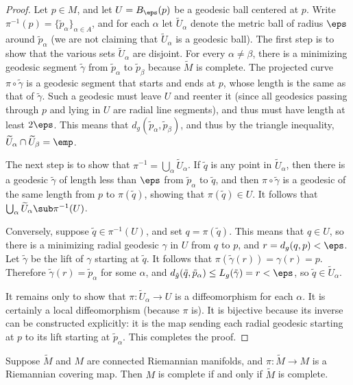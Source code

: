 \begin{proof}
Let $p\in M$, and let $U=B_{\eps}(p)$ be a geodesic ball centered at $p$. Write $\pi^{-1}(p)=\{\tilde{p}_\alpha\}_{\alpha\in A}$, and for each $\alpha$ let $\widetilde{U}_\alpha$ 
denote the metric ball of radius $\eps$ around $\tilde{p}_\alpha$ (we are not claiming that $\widetilde{U}_\alpha$ is a geodesic ball). The first step is to show that the various sets $\widetilde{U}_\alpha$ are disjoint. For every $\alpha\neq\beta$, there is a minimizing geodesic segment $\tilde{\gamma}$ from $\tilde{p}_\alpha$ to $\tilde{p}_\beta$ because $\widetilde{M}$ is complete. The projected curve $\pi\circ\tilde{\gamma}$ is a geodesic segment that starts and ends at $p$, whose length is the same as that of $\tilde{\gamma}$. Such a geodesic must leave $U$ and reenter it (since all geodesics passing through $p$ and lying in $U$ are radial line segments), and thus must have length at least $2\eps$. This means that $d_g(\tilde{p}_\alpha,\tilde{p}_\beta)$, and thus by the 
triangle inequality, $\widetilde{U}_\alpha\cap\widetilde{U}_\beta=\emp$.\par
The next step is to show that $\pi^{-1}=\bigcup_\alpha\widetilde{U}_\alpha$. If $\tilde{q}$ is any point in $\widetilde{U}_\alpha$, then there is a geodesic $\tilde{\gamma}$ of length less than $\eps$ from $\tilde{p}_\alpha$ to $\tilde{q}$, and then $\pi\circ\tilde{\gamma}$ is a geodesic of the same length from $p$ to $\pi(\tilde{q})$, showing that $\pi(\tilde{q})\in U$. It follows that $\bigcup_\alpha\widetilde{U}_\alpha\sub\pi^{-1}(U)$.\par
Conversely, suppose $\tilde{q}\in\pi^{-1}(U)$, and set $q=\pi(\tilde{q})$. This means that $q\in U$, so there is a minimizing radial geodesic $\gamma$ in $U$ from $q$ to $p$, and $r=d_g(q,p)<\eps$. Let $\tilde{\gamma}$ be the lift of $\gamma$ starting at $\tilde{q}$. It follows that $\pi(\tilde{\gamma}(r))=\gamma(r)=p$. Therefore $\tilde{\gamma}(r)=\tilde{p}_\alpha$ for some $\alpha$, and $d_{\tilde{g}}(\tilde{q},\tilde{p}_\alpha)\leq L_g(\tilde{\gamma})=r<\eps$, so $\tilde{q}\in\widetilde{U}_\alpha$.\par
It remains only to show that $\pi:\widetilde{U}_\alpha\to U$ is a diffeomorphism for each $\alpha$. It is certainly a local diffeomorphism (because $\pi$ is). It is bijective because its inverse can be constructed explicitly: it is the map sending each radial geodesic starting at $p$ to its lift starting at $\tilde{p}_\alpha$. This completes the proof.
\end{proof}
\begin{corollary}\label{Riemann cover complete iff}
Suppose $\widetilde{M}$ and $M$ are connected Riemannian manifolds, and $\pi:\widetilde{M}\to M$ is a Riemannian covering map. Then $M$ is complete if and only if $\widetilde{M}$ is complete.
\end{corollary}
